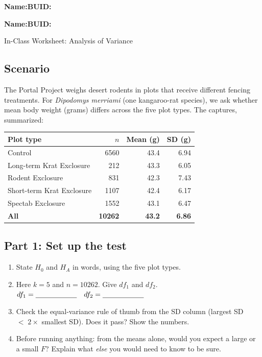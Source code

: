 \documentclass{article}
\newcommand{\blankline}[1]{\underline{\hspace{#1}}}
\begin{document}
\noindent\textbf{Name:}\blankline{2.25in}\hfill\textbf{BUID:}\blankline{1.55in}

\medskip

\noindent\textbf{Name:}\blankline{2.25in}\hfill\textbf{BUID:}\blankline{1.55in}\newline

\begin{center}
 \Large In-Class Worksheet: Analysis of Variance
\end{center}

\subsection*{Scenario}
The Portal Project weighs desert rodents in plots that receive different fencing treatments. For \emph{Dipodomys merriami} (one kangaroo-rat species), we ask whether mean body weight (grams) differs across the five plot types. The captures, summarized:

\begin{center}
\renewcommand{\arraystretch}{1.2}
\begin{tabular}{lrrr}
\toprule
Plot type & $n$ & Mean (g) & SD (g) \\
\midrule
Control                    & 6560 & 43.4 & 6.94 \\
Long-term Krat Exclosure   &  212 & 43.3 & 6.05 \\
Rodent Exclosure           &  831 & 42.3 & 7.43 \\
Short-term Krat Exclosure  & 1107 & 42.4 & 6.17 \\
Spectab Exclosure          & 1552 & 43.1 & 6.47 \\
\midrule
\textbf{All} & \textbf{10262} & \textbf{43.2} & \textbf{6.86} \\
\bottomrule
\end{tabular}
\end{center}

\newpage

\subsection*{Part 1: Set up the test}

\begin{enumerate}[label={\bfseries (\Alph*)},itemsep=.8em]
\item State $H_0$ and $H_A$ in words, using the five plot types. \\[3.5em]
\item Here $k = 5$ and $n = 10262$. Give $df_1$ and $df_2$. \hfill $df_1 = \blankline{0.8in}\quad df_2 = \blankline{0.8in}$ \\[1.5em]
\item Check the equal-variance rule of thumb from the SD column (largest SD $<\;2\times$ smallest SD). Does it pass? Show the numbers. \\[3em]
\item Before running anything: from the means alone, would you expect a large or a small $F$? Explain what \emph{else} you would need to know to be sure. \\[3.5em]
\end{enumerate}
\end{document}
